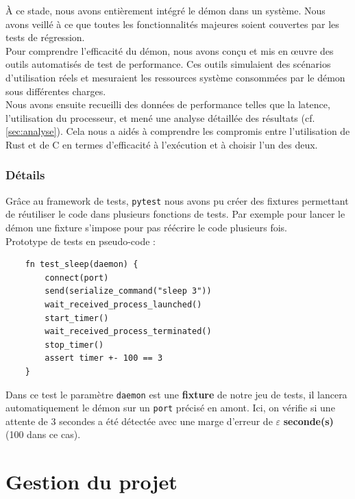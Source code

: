\documentclass{article}
\begin{document}
À ce stade, nous avons entièrement intégré le démon dans un système. Nous avons veillé à ce que toutes les fonctionnalités majeures soient couvertes par les tests de régression.\\

Pour comprendre l’efficacité du démon, nous avons conçu et mis en œuvre des outils automatisés de test de performance. Ces outils simulaient des scénarios d’utilisation réels et mesuraient les ressources système consommées par le démon sous différentes charges.\\

Nous avons ensuite recueilli des données de performance telles que la latence, l’utilisation du processeur, et mené une analyse détaillée des résultats (cf. \ref{sec:analyse}). Cela nous a aidés à comprendre les compromis entre l'utilisation de Rust et de C en termes d’efficacité à l'exécution et à choisir l’un des deux.

\subsubsection{Détails}

Grâce au framework de tests, \texttt{pytest} nous avons pu créer des fixtures permettant de réutiliser le code dans plusieurs fonctions de tests. Par exemple pour lancer le démon une fixture s'impose pour pas réécrire le code plusieurs fois.\\

Prototype de tests en pseudo-code : 

\begin{verbatim}
    fn test_sleep(daemon) {
        connect(port)
        send(serialize_command("sleep 3"))
        wait_received_process_launched()
        start_timer()
        wait_received_process_terminated()
        stop_timer()
        assert timer +- 100 == 3
    }
\end{verbatim}

Dans ce test le paramètre \texttt{daemon} est une \textbf{fixture} de notre jeu de tests, il lancera automatiquement le démon sur un \texttt{port} précisé en amont. Ici, on vérifie si une attente de 3 secondes a été détectée avec une marge d’erreur de $\varepsilon$ \textbf{seconde(s)} (100 dans ce cas).


\section{Gestion du projet}
\end{document}
